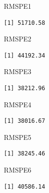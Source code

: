 \documentclass[
  letterpaper,
  DIV=11,
  numbers=noendperiod]{scrreprt}
\newenvironment{Shaded}{\begin{snugshade}}{\end{snugshade}}
\newcommand{\NormalTok}[1]{\textcolor[rgb]{0.00,0.23,0.31}{#1}}
\begin{document}
\begin{Shaded}
\begin{Highlighting}[]
\NormalTok{RMSPE1}
\end{Highlighting}
\end{Shaded}

\begin{verbatim}
[1] 51710.58
\end{verbatim}

\begin{Shaded}
\begin{Highlighting}[]
\NormalTok{RMSPE2}
\end{Highlighting}
\end{Shaded}

\begin{verbatim}
[1] 44192.34
\end{verbatim}

\begin{Shaded}
\begin{Highlighting}[]
\NormalTok{RMSPE3}
\end{Highlighting}
\end{Shaded}

\begin{verbatim}
[1] 38212.96
\end{verbatim}

\begin{Shaded}
\begin{Highlighting}[]
\NormalTok{RMSPE4}
\end{Highlighting}
\end{Shaded}

\begin{verbatim}
[1] 38016.67
\end{verbatim}

\begin{Shaded}
\begin{Highlighting}[]
\NormalTok{RMSPE5}
\end{Highlighting}
\end{Shaded}

\begin{verbatim}
[1] 38245.46
\end{verbatim}

\begin{Shaded}
\begin{Highlighting}[]
\NormalTok{RMSPE6}
\end{Highlighting}
\end{Shaded}

\begin{verbatim}
[1] 40586.14
\end{verbatim}
\end{document}
